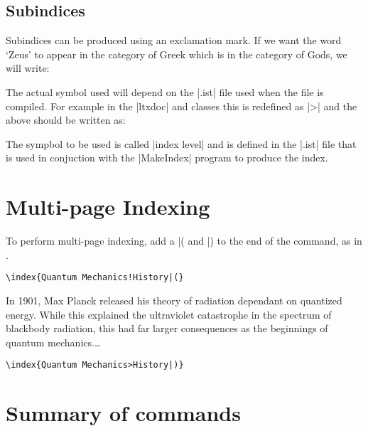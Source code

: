\begin{multicols}{2}
\subsection{Subindices}
Subindices can be produced using an exclamation mark. If we want the word `Zeus'
to appear in the category of Greek which is in the category of Gods, we will write:

\begin{teX}
\end{teX}

The actual symbol used will depend on the |.ist| file used when the file is compiled. For example in the |ltxdoc| and  classes this is redefined as |>| and the above should be written as:

\begin{sverbatim}
\end{sverbatim}

The sympbol to be used is called |index level| and is defined in the |.ist| file that is used in conjuction with the |MakeIndex| program to produce the index.

\section{Multi-page Indexing}

To perform multi-page indexing, add a |( and |) to the end of the \cmd{\index} command, as in 
.

{\small
\verb+\index{Quantum Mechanics!History|(}+

\narrower\narrower
In 1901, Max Planck released his theory of radiation dependant 
on quantized energy. While this explained the ultraviolet catastrophe
 in the spectrum of blackbody radiation, this had far larger consequences 
as the beginnings of quantum mechanics.\ldots

\verb+\index{Quantum Mechanics>History|)}+
}

\end{multicols}



\section{Summary of commands}

